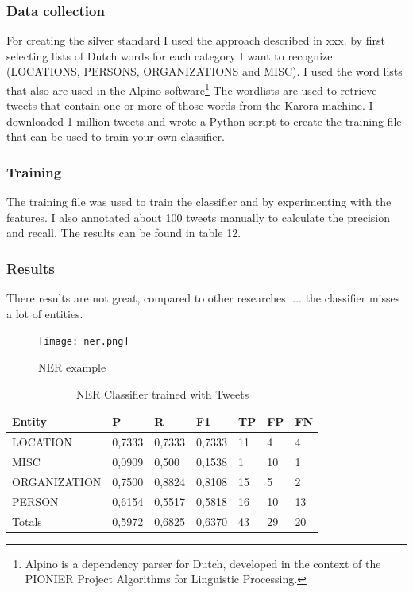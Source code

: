 \documentclass[
10pt, %
a4paper, %
oneside, %
headinclude,footinclude, %
BCOR5mm, %
]{scrartcl}
\begin{document}
\subsubsection{Data collection}
For creating the silver standard I used the approach described in xxx. by first selecting lists of Dutch words for each category I want to recognize (LOCATIONS, PERSONS, ORGANIZATIONS and MISC).  I used the word lists that also are used in the Alpino software\footnote{Alpino is a dependency parser for Dutch, developed in the context of the PIONIER Project Algorithms for Linguistic Processing. }
The wordlists are used to retrieve tweets that contain one or more of those words from the Karora machine. I downloaded 1 million tweets and wrote a Python script to create the training file that can be used to train your own classifier.

\subsubsection{Training}
The training file was used to train the classifier and by experimenting with the features. I also annotated about 100 tweets manually to calculate the precision and recall. The results can be found in table 12.


\subsubsection{Results}
There results are not great, compared to other researches .... the classifier misses a lot of entities. 

\begin{figure}[htbp] %
   \centering
   \texttt{[image: ner.png]} 
   \caption{NER example}
   \label{fig:example}
\end{figure}




\begin{table}[h]
\caption[NER Classifier trained with Tweets]{NER Classifier trained with Tweets }
\begin{tabular}{|l|l|l|l|l|l|l|}
\hline
Entity       & P      & R      & F1     & TP & FP & FN   \\ \hline
LOCATION     & 0,7333 & 0,7333 & 0,7333 & 11 & 4  & 4    \\ \hline
MISC         & 0,0909 & 0,500  & 0,1538 & 1  & 10 & 1    \\ \hline
ORGANIZATION & 0,7500 & 0,8824 & 0,8108 & 15 & 5  & 2    \\ \hline
PERSON       & 0,6154 & 0,5517 & 0,5818 & 16 & 10 & 13   \\ \hline
Totals       & 0,5972 & 0,6825 & 0,6370 & 43 & 29 & 20 \\ \hline
\end{tabular}

\end{table}
\end{document}
